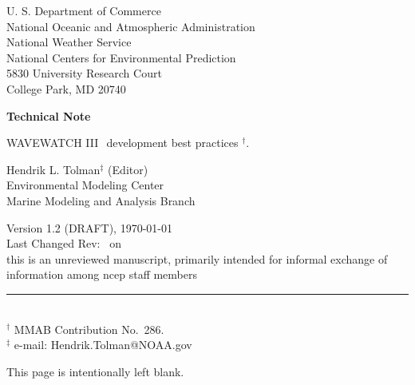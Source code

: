 \documentclass[12pt]{article}
\newcommand{\wwt}{WAVEWATCH III$\:$\textsuperscript\textregistered}
\newcommand{\bpage}{\vfill \pagebreak \strut

\vspace{2.5in} \centerline{This page is intentionally left blank.}}
\begin{document}

\pagestyle{empty}

\strut \vspace{5mm}

\begin{center} 
U. S. Department of Commerce \\
National Oceanic and Atmospheric Administration \\
National Weather Service \\
National Centers for Environmental Prediction \\
5830 University Research Court \\
College Park, MD 20740

\vspace{15mm}

{\bf Technical Note}

\vspace{15mm}

{\large \wwt\ development best practices $^\dag$.} \\

\vspace{20mm}

Hendrik L. Tolman$^\ddag$ (Editor)
\\
Environmental Modeling Center \\
Marine Modeling and Analysis Branch

\vspace{25mm}

Version 1.2 (DRAFT), \today 
\\ Last Changed Rev: \SVNRevision\ on \SVNDate \\
\vspace{\baselineskip}
\vfill {\sc this is an unreviewed manuscript, primarily
intended for informal exchange of information among ncep staff
members}

\end{center}
\noindent \rule{140mm}{0.5mm} \\
{\small $^\dag$ MMAB Contribution No.~286. \\
$^\ddag$ e-mail: Hendrik.Tolman@NOAA.gov} \\

\bpage

\pagebreak
\end{document}
